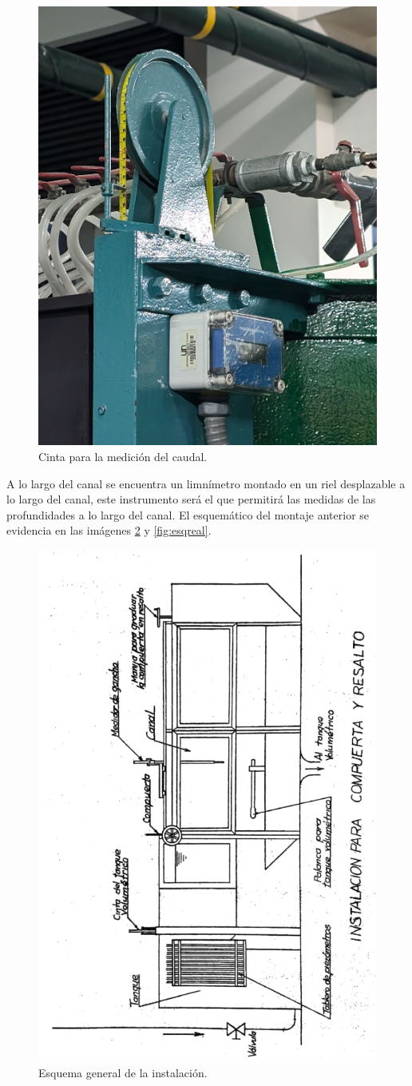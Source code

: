 \documentclass[10pt, a4paper]{exam}
\begin{document}
\begin{figure}[h]
    \centering
    \includegraphics[width=0.19\linewidth]{Images/cinta.png}
    \caption{Cinta para la medición del caudal.}
    \label{fig:cinta}
\end{figure}

\newpage

A lo largo del canal se encuentra un limnímetro montado en un riel desplazable a lo largo del canal, este instrumento será el que permitirá las medidas de las profundidades a lo largo del canal. El esquemático del montaje anterior se evidencia en las imágenes \ref{fig:esqpdf} y \ref{fig:esqreal}.

\begin{figure}[h]
    \centering
    \includegraphics[angle=270,width=0.75\linewidth]{Images/esquema.png}
    \caption{Esquema general de la instalación.}
    \label{fig:esqpdf}
\end{figure}
\end{document}
